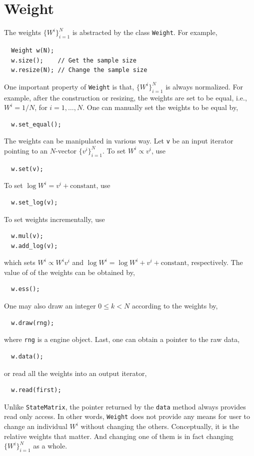 \section{Weight}
\label{sec:Weight}

The weights $\{W^i\}_{i=1}^N$ is abstracted by the class \verb|Weight|. For
example,
\begin{Verbatim}
  Weight w(N);
  w.size();    // Get the sample size
  w.resize(N); // Change the sample size
\end{Verbatim}
One important property of \verb|Weight| is that, $\{W^i\}_{i=1}^N$ is always
normalized. For example, after the construction or resizing, the weights are
set to be equal, i.e., $W^i = 1 / N$, for $i = 1,\dots,N$. One can manually set
the weights to be equal by,
\begin{Verbatim}
  w.set_equal();
\end{Verbatim}
The weights can be manipulated in various way. Let \verb|v| be an input
iterator pointing to an $N$-vector $\{v^i\}_{i=1}^N$. To set $W^i \propto v^i$,
use
\begin{Verbatim}
  w.set(v);
\end{Verbatim}
To set $\log W^i = v^i + \mathrm{constant}$, use
\begin{Verbatim}
  w.set_log(v);
\end{Verbatim}
To set weights incrementally, use
\begin{Verbatim}
  w.mul(v);
  w.add_log(v);
\end{Verbatim}
which sets $W^i \propto W^i v^i$ and $\log W^i = \log W^i + v^i +
\mathrm{constant}$, respectively. The value of \ess of the weights can be
obtained by,
\begin{Verbatim}
  w.ess();
\end{Verbatim}
One may also draw an integer $0 \le k < N$ according to the weights by,
\begin{Verbatim}
  w.draw(rng);
\end{Verbatim}
where \verb|rng| is a \cppoo{} \rng engine object. Last, one can obtain a
pointer to the raw data,
\begin{Verbatim}
  w.data();
\end{Verbatim}
or read all the weights into an output iterator,
\begin{Verbatim}
  w.read(first);
\end{Verbatim}
Unlike \verb|StateMatrix|, the pointer returned by the \verb|data| method
always provides read only access. In other words, \verb|Weight| does not
provide any means for user to change an individual $W^i$ without changing the
others. Conceptually, it is the relative weights that matter. And changing one
of them is in fact changing $\{W^i\}_{i=1}^N$ as a whole.

